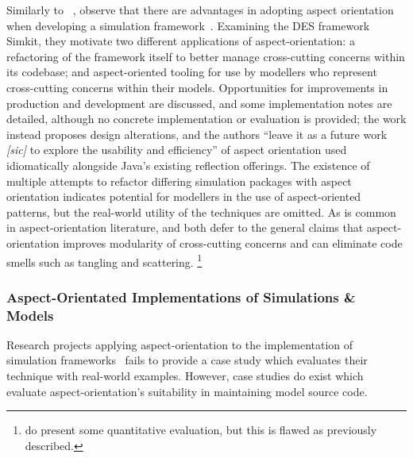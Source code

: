 Similarly to
\citeauthor{chibani2019using}~\cite{chibani2019using,chibani2013toward,chibani2014practical},
\citeauthor{DEVSaspectorientation2008aksu} observe that there are advantages in
adopting aspect orientation when developing a simulation
framework~\cite{DEVSaspectorientation2008aksu}. Examining the DES framework
Simkit, they motivate two different
applications of aspect-orientation: a refactoring of the framework itself to
better manage cross-cutting concerns within its codebase; and aspect-oriented
tooling for use by modellers who represent cross-cutting concerns within their
models. Opportunities for improvements in production and development are
discussed, and some implementation notes are detailed, although no concrete
implementation or evaluation is provided; the work instead proposes design
alterations, and the authors ``leave it as a future work \emph{[sic]} to explore
the usability and efficiency'' of aspect orientation used idiomatically
alongside Java's existing reflection offerings. The existence of multiple
attempts to refactor differing simulation packages with aspect orientation
indicates potential for modellers in the use of aspect-oriented patterns, but
the real-world utility of the techniques are omitted. As is common in
aspect-orientation literature, \citeauthor{chibani2019using} and
\citeauthor{DEVSaspectorientation2008aksu} both defer to the general claims that
aspect-orientation improves modularity of cross-cutting concerns and can
eliminate code smells such as tangling and scattering.
\footnote{\citeauthor{chibani2014practical} do present some quantitative
  evaluation, but this is flawed as previously described.}



\subsubsection{Aspect-Orientated Implementations of Simulations \& Models}

Research projects applying aspect-orientation to the implementation of
simulation frameworks~\cite{chibani} fails to provide a case study which evaluates
their technique with real-world examples. However, case studies do exist which
evaluate aspect-orientation's suitability in maintaining model source code.

